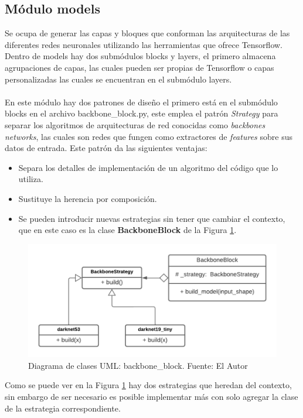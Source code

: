 \subsection{Módulo models}
Se ocupa de generar las capas y bloques que conforman las arquitecturas de las diferentes redes neuronales utilizando las herramientas que ofrece Tensorflow. Dentro de models hay dos submódulos blocks y layers, el primero almacena agrupaciones de capas, las cuales pueden ser propias de Tensorflow o capas personalizadas las cuales se encuentran en el submódulo layers. 
\\
\\
En este módulo hay dos patrones de diseño el primero está en el submódulo blocks en el archivo backbone\_block.py, este emplea el patrón \textit{Strategy} para separar los algoritmos de arquitecturas de red conocidas como \textit{backbones networks}, las cuales son redes que fungen como extractores de \textit{features} sobre sus datos de entrada. Este patrón da las siguientes ventajas:
\begin{itemize}
    \item Separa los detalles de implementación de un algoritmo del código que lo utiliza.
    \item Sustituye la herencia por composición.
    \item Se pueden introducir nuevas estrategias sin tener que cambiar el contexto, que en este caso es la clase \textbf{BackboneBlock} de la Figura \ref{backbone_block_uml}.
\end{itemize}
\begin{figure}[H]
    \centering
    \includegraphics[scale=0.5]{Recursos/backbone_block_uml.png}
    \caption[Diagrama de clases UML: backbone\_block.]{Diagrama de clases UML: backbone\_block. {\footnotesize Fuente: El Autor}}
    \label{backbone_block_uml}
\end{figure}
Como se puede ver en la Figura \ref{backbone_block_uml} hay dos estrategias que heredan del contexto, sin embargo de ser necesario es posible implementar más con solo agregar la clase de la estrategia correspondiente.
